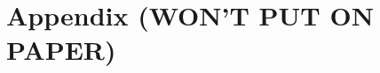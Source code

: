 \documentclass{article}
\begin{document}



\newpage


\section{Appendix (WON'T PUT ON PAPER)}
\end{document}
